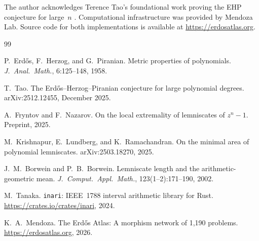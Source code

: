 \documentclass[11pt]{article}
\theoremstyle{plain}
\theoremstyle{definition}
\theoremstyle{remark}
\begin{document}
The author acknowledges Terence Tao's foundational work proving the EHP conjecture for large~$n$ \cite{Tao2025}. Computational infrastructure was provided by Mendoza Lab. Source code for both implementations is available at \url{https://erdosatlas.org}.

\begin{thebibliography}{99}

P.~Erd\H{o}s, F.~Herzog, and G.~Piranian.
Metric properties of polynomials.
\emph{J.~Anal.~Math.}, 6:125--148, 1958.

T.~Tao.
The Erd\H{o}s--Herzog--Piranian conjecture for large polynomial degrees.
arXiv:2512.12455, December 2025.

A.~Fryntov and F.~Nazarov.
On the local extremality of lemniscates of $z^n - 1$.
Preprint, 2025.

M.~Krishnapur, E.~Lundberg, and K.~Ramachandran.
On the minimal area of polynomial lemniscates.
arXiv:2503.18270, 2025.

J.~M.~Borwein and P.~B.~Borwein.
Lemniscate length and the arithmetic-geometric mean.
\emph{J.~Comput.~Appl.~Math.}, 123(1--2):171--190, 2002.

M.~Tanaka.
\texttt{inari}: IEEE~1788 interval arithmetic library for Rust.
\url{https://crates.io/crates/inari}, 2024.

K.~A.~Mendoza.
The Erd\H{o}s Atlas: A morphism network of 1,190 problems.
\url{https://erdosatlas.org}, 2026.

\end{thebibliography}
\end{document}
